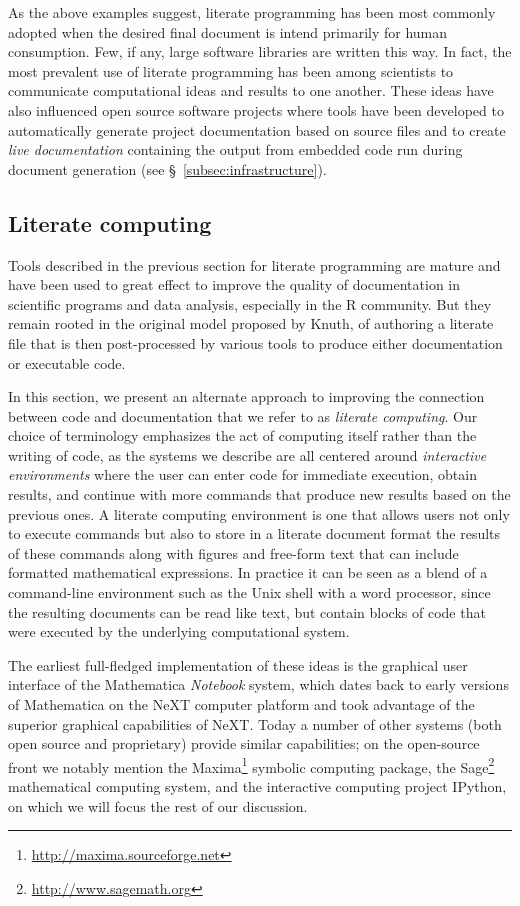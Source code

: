 \documentclass[11pt,oneside,english]{article}
\begin{document}
As the above examples suggest, literate programming has been most commonly
adopted when the desired final document is intend primarily for human
consumption.  Few, if any, large software libraries are written this way.  In
fact, the most prevalent use of literate programming has been among scientists
to communicate computational ideas and results to one another.  These ideas
have also influenced open source software projects where tools have been
developed to automatically generate project documentation based on source files
and to create \emph{live documentation} containing the output from embedded
code run during document generation (see §~\ref{subsec:infrastructure}).


\subsection{Literate computing}

Tools described in the previous section for literate programming are mature and
have been used to great effect to improve the quality of documentation in
scientific programs and data analysis, especially in the R community.  But they
remain rooted in the original model proposed by Knuth, of authoring a
literate file that is then post-processed by various tools to produce either
documentation or executable code.  

In this section, we present an alternate approach to improving the connection
between code and documentation that we refer to as \emph{literate computing}.
Our choice of terminology emphasizes the act of computing itself rather than
the writing of code, as the systems we describe are all centered around
\emph{interactive environments} where the user can enter code for immediate
execution, obtain results, and continue with more commands that produce new
results based on the previous ones.  A literate computing environment is one
that allows users not only to execute commands but also to store in a literate
document format the results of these commands along with figures and free-form
text that can include formatted mathematical expressions.  In practice it can
be seen as a blend of a command-line environment such as the Unix shell with a
word processor, since the resulting documents can be read like text, but
contain blocks of code that were executed by the underlying computational
system.

The earliest full-fledged implementation of these ideas is the graphical user
interface of the Mathematica \emph{Notebook} system, which dates back to early
versions of Mathematica on the NeXT computer platform and took advantage of the
superior graphical capabilities of NeXT.  Today a number of other systems (both
open source and proprietary) provide similar capabilities; on the open-source
front we notably mention the
Maxima\footnote{\url{http://maxima.sourceforge.net}} symbolic computing
package, the Sage\footnote{\url{http://www.sagemath.org}} mathematical
computing system, and the interactive computing project IPython, on which we
will focus the rest of our discussion.
\end{document}

